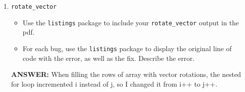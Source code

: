 \begin{enumerate}
    \item \texttt{rotate\_vector}
    \begin{itemize}
        \item Use the \texttt{listings} package to include your \texttt{rotate\_vector} output in the pdf.
        \item For each bug, use the \texttt{listings} package to display the original line of code with the error, as well as the fix.  Describe the error.
    \end{itemize}
    \textbf{ANSWER:} 
    When filling the rows of array with vector rotations, the nested for loop incremented i instead of j, so I changed it from i++ to j++.
    
\end{enumerate}
